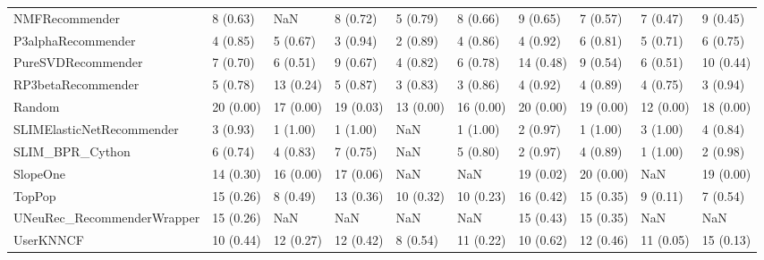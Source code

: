 \begin{tabular}{llllllllll}
                     NMFRecommender &                 8 (0.63) &         NaN &      8 (0.72) &     5 (0.79) &             8 (0.66) &            9 (0.65) &          7 (0.57) &           7 (0.47) &          9 (0.45) \\
                 P3alphaRecommender &                 4 (0.85) &    5 (0.67) &      3 (0.94) &     2 (0.89) &             4 (0.86) &            4 (0.92) &          6 (0.81) &           5 (0.71) &          6 (0.75) \\
                 PureSVDRecommender &                 7 (0.70) &    6 (0.51) &      9 (0.67) &     4 (0.82) &             6 (0.78) &           14 (0.48) &          9 (0.54) &           6 (0.51) &         10 (0.44) \\
                 RP3betaRecommender &                 5 (0.78) &   13 (0.24) &      5 (0.87) &     3 (0.83) &             3 (0.86) &            4 (0.92) &          4 (0.89) &           4 (0.75) &          3 (0.94) \\
                             Random &                20 (0.00) &   17 (0.00) &     19 (0.03) &    13 (0.00) &            16 (0.00) &           20 (0.00) &         19 (0.00) &          12 (0.00) &         18 (0.00) \\
          SLIMElasticNetRecommender &                 3 (0.93) &    1 (1.00) &      1 (1.00) &          NaN &             1 (1.00) &            2 (0.97) &          1 (1.00) &           3 (1.00) &          4 (0.84) \\
                    SLIM\_BPR\_Cython &                 6 (0.74) &    4 (0.83) &      7 (0.75) &          NaN &             5 (0.80) &            2 (0.97) &          4 (0.89) &           1 (1.00) &          2 (0.98) \\
                           SlopeOne &                14 (0.30) &   16 (0.00) &     17 (0.06) &          NaN &                  NaN &           19 (0.02) &         20 (0.00) &                NaN &         19 (0.00) \\
                             TopPop &                15 (0.26) &    8 (0.49) &     13 (0.36) &    10 (0.32) &            10 (0.23) &           16 (0.42) &         15 (0.35) &           9 (0.11) &          7 (0.54) \\
         UNeuRec\_RecommenderWrapper &                15 (0.26) &         NaN &           NaN &          NaN &                  NaN &           15 (0.43) &         15 (0.35) &                NaN &               NaN \\
                          UserKNNCF &                10 (0.44) &   12 (0.27) &     12 (0.42) &     8 (0.54) &            11 (0.22) &           10 (0.62) &         12 (0.46) &          11 (0.05) &         15 (0.13) \\
\bottomrule
\end{tabular}
